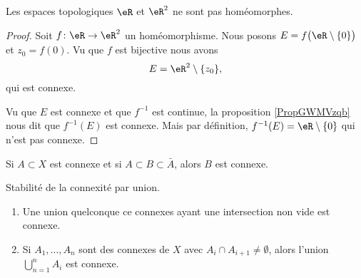 \begin{example}
    Les espaces topologiques \( \eR\) et \( \eR^2\) ne sont pas homéomorphes.
\end{example}

\begin{proof}
    Soit \( f\colon \eR\to \eR^2\) un homéomorphisme. Nous posons \( E=f\big( \eR\setminus\{ 0 \} \big)\) et \( z_0=f(0)\). Vu que \( f\) est bijective nous avons
    \begin{equation}
        E=\eR^2\setminus\{ z_0 \},
    \end{equation}
    qui est connexe.

    Vu que \( E\) est connexe et que \( f^{-1}\) est continue, la proposition \ref{PropGWMVzqb} nous dit que \( f^{-1}(E)\) est connexe. Mais par définition, \( f^{-1}(E)=\eR\setminus\{ 0 \}\) qui n'est pas connexe.
\end{proof}


\begin{proposition}
    Si \( A\subset X\) est connexe et si \( A\subset B\subset \bar A\), alors \( B\) est connexe.
\end{proposition}

\begin{proposition} \label{PropIWIDzzH}
    Stabilité de la connexité par union.
    \begin{enumerate}
        \item
    Une union quelconque ce connexes ayant une intersection non vide est connexe.
\item
    Si \( A_1,\ldots, A_n\) sont des connexes de \( X\) avec \( A_i\cap A_{i+1}\neq \emptyset\), alors l'union \( \bigcup_{n=1}^nA_i\) est connexe.
    \end{enumerate}
\end{proposition}

